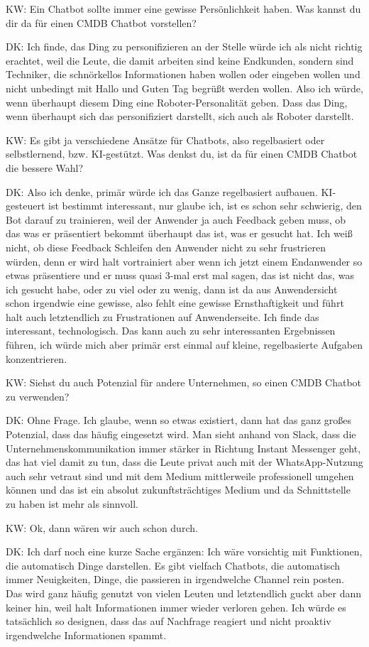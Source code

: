 \begin{list}{X:}{\setlength{\labelsep}{5mm}}
\item[KW:] Ein Chatbot sollte immer eine gewisse Persönlichkeit haben. Was kannst du dir da für einen CMDB Chatbot vorstellen?
\item[DK:] Ich finde, das Ding zu personifizieren an der Stelle würde ich als nicht richtig erachtet, weil die Leute, die damit arbeiten sind keine Endkunden, sondern sind Techniker, die schnörkellos Informationen haben wollen oder eingeben wollen und nicht unbedingt mit Hallo und Guten Tag begrüßt werden wollen. Also ich würde, wenn überhaupt diesem Ding eine Roboter-Personalität geben. Dass das Ding, wenn überhaupt sich das personifiziert darstellt, sich auch als Roboter darstellt.  
\item[KW:] Es gibt ja verschiedene Ansätze für Chatbots, also regelbasiert oder selbstlernend, bzw. KI-gestützt. Was denkst du, ist da für einen CMDB Chatbot die bessere Wahl?
\item[DK:] Also ich denke, primär würde ich das Ganze regelbasiert aufbauen. KI-gesteuert ist bestimmt interessant, nur glaube ich, ist es schon sehr schwierig, den Bot darauf zu trainieren, weil der Anwender ja auch Feedback geben muss, ob das was er präsentiert bekommt überhaupt das ist, was er gesucht hat. Ich weiß nicht, ob diese Feedback Schleifen den Anwender nicht zu sehr frustrieren würden, denn er wird halt vortrainiert aber wenn ich jetzt einem Endanwender so etwas präsentiere und er muss quasi 3-mal erst mal sagen, das ist nicht das, was ich gesucht habe, oder zu viel oder zu wenig, dann ist da aus Anwendersicht schon irgendwie eine gewisse, also fehlt eine gewisse Ernsthaftigkeit und führt halt auch letztendlich zu Frustrationen auf Anwenderseite. Ich finde das interessant, technologisch. Das kann auch zu sehr interessanten Ergebnissen führen, ich würde mich aber primär erst einmal auf kleine, regelbasierte Aufgaben konzentrieren.  
\item[KW:] Siehst du auch Potenzial für andere Unternehmen, so einen CMDB Chatbot zu verwenden?
\item[DK:] Ohne Frage. Ich glaube, wenn so etwas existiert, dann hat das ganz großes Potenzial, dass das häufig eingesetzt wird. Man sieht anhand von Slack, dass die Unternehmenskommunikation immer stärker in Richtung Instant Messenger geht, das hat viel damit zu tun, dass die Leute privat auch mit der WhatsApp-Nutzung auch sehr vetraut sind und mit dem Medium mittlerweile professionell umgehen können und das ist ein absolut zukunftsträchtiges Medium und da Schnittstelle zu haben ist mehr als sinnvoll.
\item[KW:] Ok, dann wären wir auch schon durch.
\item[DK:] Ich darf noch eine kurze Sache ergänzen: Ich wäre vorsichtig mit Funktionen, die automatisch Dinge darstellen. Es gibt vielfach Chatbots, die automatisch immer Neuigkeiten, Dinge, die passieren in irgendwelche Channel rein posten. Das wird ganz häufig genutzt von vielen Leuten und letztendlich guckt aber dann keiner hin, weil halt Informationen immer wieder verloren gehen. Ich würde es tatsächlich so designen, dass das auf Nachfrage reagiert und nicht proaktiv irgendwelche Informationen spammt.
\end{list}
